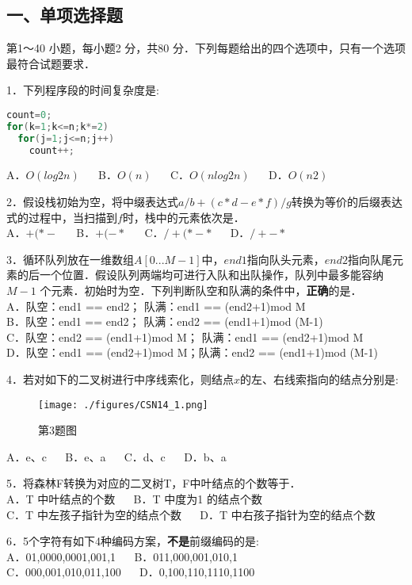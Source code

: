 
\subsection{一、单项选择题}
第1～40 小题，每小题2 分，共80 分．下列每题给出的四个选项中，只有一个选项最符合试题要求．

1．下列程序段的时间复杂度是:
\begin{lstlisting}[language=cpp]
count=0;
for(k=1;k<=n;k*=2)
  for(j=1;j<=n;j++)
    count++;
\end{lstlisting}
A．$O(log2n)$ $\quad$ B．$O(n)$ $\quad$ C．$O(nlog2n)$ $\quad$ D．$O(n2)$

2．假设栈初始为空，将中缀表达式$a/b+(c*d-e*f)/g$转换为等价的后缀表达式的过程中，当扫描到$f$时，栈中的元素依次是． \\
A．$+ ( * -$  $\quad$ B．$+ ( - *$  $\quad$ C．$/ + ( * - *$  $\quad$ D．$/ + - *$

3．循环队列放在一维数组$A[0...M-1]$中，$end1$指向队头元素，$end2$指向队尾元素的后一个位置．假设队列两端均可进行入队和出队操作，队列中最多能容纳$M-1$ 个元素．初始时为空．下列判断队空和队满的条件中，\textbf{正确}的是． \\
A．队空：end1 == end2； 队满：end1 == (end2+1)mod M \\
B．队空：end1 == end2； 队满：end2 == (end1+1)mod (M-1) \\
C．队空：end2 == (end1+1)mod M； 队满：end1 == (end2+1)mod M \\
D．队空：end1 == (end2+1)mod M；队满：end2 == (end1+1)mod (M-1)

4．若对如下的二叉树进行中序线索化，则结点$x$的左、右线索指向的结点分别是:
\begin{figure}[ht]
\centering
\texttt{[image: ./figures/CSN14\_1.png]}
\caption{第3题图} \label{CSN14_fig1}
\end{figure}
A．e、c $\quad$ B．e、a $\quad$ C．d、c $\quad$ D．b、a

5．将森林F转换为对应的二叉树T，F中叶结点的个数等于． \\
A．T 中叶结点的个数 $\quad$ B．T 中度为1 的结点个数 \\
C．T 中左孩子指针为空的结点个数 $\quad$ D．T 中右孩子指针为空的结点个数

6．5个字符有如下4种编码方案，\textbf{不是}前缀编码的是: \\
A．01,0000,0001,001,1 $\quad$ B．011,000,001,010,1 \\
C．000,001,010,011,100 $\quad$ D．0,100,110,1110,1100

